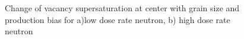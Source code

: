 \documentclass[a4paper]{article}
\begin{document}
      \begin{figure}[htb!]  %
        \centering
        \qquad
        \caption{Change of vacancy supersaturation at center with grain size and production bias for a)low dose rate neutron, b) high dose rate neutron}
        \label{figure:3D_supersaturation_neutron}
      \end{figure}
\end{document}
